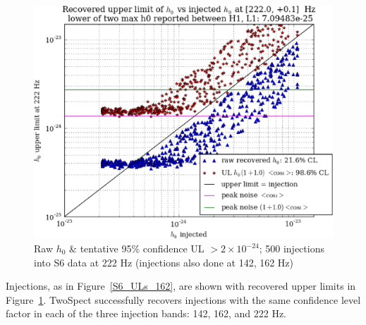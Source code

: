 \begin{figure}
\begin{center}
\includegraphics[width=0.70\paperwidth,height=0.48\paperheight]{plots/h0UL-vs-h0injected-222-0Hz.eps}
\caption{
Raw $h_0$ \& tentative 95\% confidence UL $>2\times10^{-24}$; 500 injections
into S6 data at 222 Hz (injections also done at 142, 162 Hz)}
\label{S6_ULs_222}
\end{center}
\end{figure}

Injections, as in Figure~\ref{S6_ULs_162}, are shown with recovered upper limits in Figure~\ref{S6_ULs_222}.
TwoSpect successfully recovers injections with the same confidence level factor in each of the three injection bands: 142, 162, and 222 Hz.




